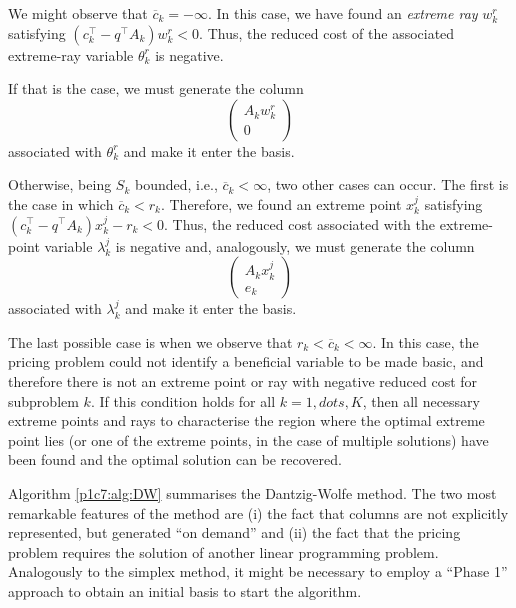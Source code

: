  We might observe that $\overline{c}_k = -\infty$. In this case, we have found an \emph{extreme ray} $w_k^r$ satisfying $(c_k^\top - q^\top A_k)w_k^r < 0$. Thus, the reduced cost of the associated extreme-ray variable $\theta_k^r$ is negative. 

If that is the case, we must generate the column
%
\begin{equation*}
	\begin{pmatrix}
		A_kw_k^r \\ 0
	\end{pmatrix}
\end{equation*}
%
associated with $\theta_k^r$ and make it enter the basis.		

Otherwise, being $S_k$ bounded, i.e., $\overline{c}_k < \infty$, two other cases can occur. The first is the case in which $\overline{c}_k < r_k$. Therefore, we found an extreme point $x_k^j$ satisfying $(c_k^\top - q^\top A_k)x_k^j - r_k < 0$. Thus, the reduced cost associated with the extreme-point variable $\lambda_k^j$ is negative and, analogously, we must generate the column
%
\begin{equation*}
	\begin{pmatrix}
		A_kx_k^j \\ e_k
	\end{pmatrix}
\end{equation*}
%
associated with $\lambda_k^j$ and make it enter the basis.

The last possible case is when we observe that $r_k < \overline{c}_k < \infty$. In this case, the pricing problem could not identify a beneficial variable to be made basic, and therefore there is not an extreme point or ray with negative reduced cost for subproblem $k$. If this condition holds for all $k = 1, dots, K$, then all necessary extreme points and rays to characterise the region where the optimal extreme point lies (or one of the extreme points, in the case of multiple solutions) have been found and the optimal solution can be recovered. 

Algorithm \ref{p1c7:alg:DW} summarises the Dantzig-Wolfe method. The two most remarkable features of the method are (i) the fact that columns are not explicitly represented, but generated ``on demand'' and (ii) the fact that the pricing problem requires the solution of another linear programming problem. Analogously to the simplex method, it might be necessary to employ a ``Phase 1'' approach to obtain an initial basis to start the algorithm.

